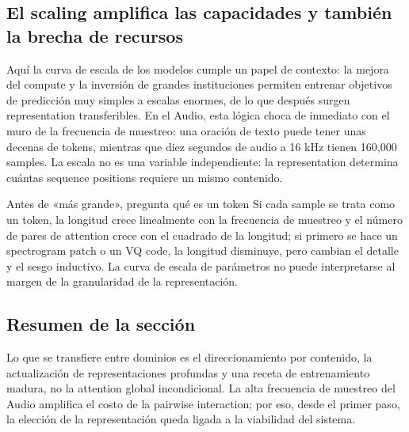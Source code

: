 \subsection{El scaling amplifica las capacidades y también la brecha de recursos}

Aquí la curva de escala de los modelos cumple un papel de contexto: la mejora del compute y la inversión de grandes instituciones permiten entrenar objetivos de predicción muy simples a escalas enormes, de lo que después surgen representation transferibles. En el Audio, esta lógica choca de inmediato con el muro de la frecuencia de muestreo: una oración de texto puede tener unas decenas de tokens, mientras que diez segundos de audio a 16 kHz tienen 160,000 samples. La escala no es una variable independiente: la representation determina cuántas sequence positions requiere un mismo contenido.


\begin{warningbox}{Antes de «más grande», pregunta qué es un token}
Si cada sample se trata como un token, la longitud crece linealmente con la frecuencia de muestreo y el número de pares de attention crece con el cuadrado de la longitud; si primero se hace un spectrogram patch o un VQ code, la longitud disminuye, pero cambian el detalle y el sesgo inductivo. La curva de escala de parámetros no puede interpretarse al margen de la granularidad de la representación.
\end{warningbox}

\subsection{Resumen de la sección}

Lo que se transfiere entre dominios es el direccionamiento por contenido, la actualización de representaciones profundas y una receta de entrenamiento madura, no la attention global incondicional. La alta frecuencia de muestreo del Audio amplifica el costo de la pairwise interaction; por eso, desde el primer paso, la elección de la representación queda ligada a la viabilidad del sistema.

